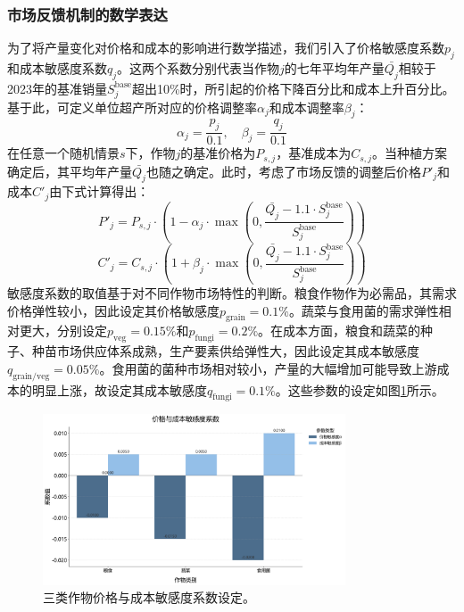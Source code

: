 \subsubsection{市场反馈机制的数学表达}
为了将产量变化对价格和成本的影响进行数学描述，我们引入了价格敏感度系数$p_j$和成本敏感度系数$q_j$。这两个系数分别代表当作物$j$的七年平均年产量$\bar{Q_j}$相较于2023年的基准销量$S_j^{\text{base}}$超出10\%时，所引起的价格下降百分比和成本上升百分比。基于此，可定义单位超产所对应的价格调整率$\alpha_j$和成本调整率$\beta_j$：
\begin{equation}
\alpha_j = \frac{p_j}{0.1}, \quad \beta_j = \frac{q_j}{0.1}
\end{equation}
在任意一个随机情景$s$下，作物$j$的基准价格为$P_{s,j}$，基准成本为$C_{s,j}$。当种植方案确定后，其平均年产量$\bar{Q_j}$也随之确定。此时，考虑了市场反馈的调整后价格$P'_{j}$和成本$C'_{j}$由下式计算得出：
\begin{equation}
P'_{j} = P_{s,j} \cdot \left(1 - \alpha_j \cdot \max\left(0, \frac{\bar{Q_j} - 1.1 \cdot S_j^{\text{base}}}{S_j^{\text{base}}}\right)\right)
\end{equation}
\begin{equation}
C'_{j} = C_{s,j} \cdot \left(1 + \beta_j \cdot \max\left(0, \frac{\bar{Q_j} - 1.1 \cdot S_j^{\text{base}}}{S_j^{\text{base}}}\right)\right)
\end{equation}
敏感度系数的取值基于对不同作物市场特性的判断。粮食作物作为必需品，其需求价格弹性较小，因此设定其价格敏感度$p_{\text{grain}}=0.1\%$。蔬菜与食用菌的需求弹性相对更大，分别设定$p_{\text{veg}}=0.15\%$和$p_{\text{fungi}}=0.2\%$。在成本方面，粮食和蔬菜的种子、种苗市场供应体系成熟，生产要素供给弹性大，因此设定其成本敏感度$q_{\text{grain/veg}}=0.05\%$。食用菌的菌种市场相对较小，产量的大幅增加可能导致上游成本的明显上涨，故设定其成本敏感度$q_{\text{fungi}}=0.1\%$。这些参数的设定如图\ref{fig:sensitivity_setup}所示。

\begin{figure}[H]
    \centering
    \includegraphics[width=0.8\textwidth]{figs/5问题三/敏感度系数设定图.png}
    \caption{三类作物价格与成本敏感度系数设定。}
    \label{fig:sensitivity_setup}
\end{figure}

